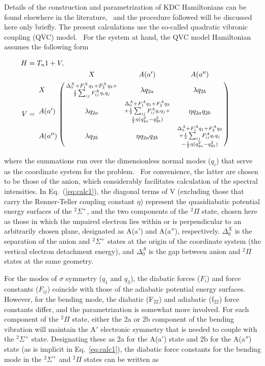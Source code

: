 \documentclass[journal=jpcafh,manuscript=article,layout=onecolumn, 12pt]{achemso}
\begin{document}
Details of the construction and parametrization of KDC Hamiltonians can be found elsewhere in the literature,~\cite{sta21,ich06,ich08,ich09,wei17} and the procedure followed will be discussed here only briefly. The present calculations use the so-called quadratic vibronic coupling (QVC) model.~\cite{ich06} For the system at hand, the QVC model Hamiltonian  assumes the following form

\begin{align}
H &= T_n1+V,\\
V &= \bordermatrix{ & X & A(a') & A(a'') \cr
	X &\substack{\Delta_0^X+F_1^Xq_1+F_3^Xq_3+\\ 
		\frac{1}{2} \sum_{ij}F^X_{ij}q_iq_j}& \lambda q_{2a} & \lambda q_{2b} \cr
	A(a') & \lambda q_{2a} & \substack{\Delta^A_0+F^A_1q_1+F^A_3q_3\\+\frac{1}{2}\sum_{ij}F^A_{ij}q_iq_j+\\\frac{1}{2}\eta(q_{2a}^2-q_{2b}^2)} & \eta q_{2a}q_{2b} \cr
	A(a'') & \lambda q_{2b} & \eta q_{2a}q_{2b} & \substack{\Delta_0^A+F_1^Aq_1+F_3^Aq_3\\+\frac{1}{2}\sum_{ij}F_{ij}^Aq_iq_j\\-\frac{1}{2}\eta(q_{2a}^2-q_{2b}^2) } } \qquad
\label{eq:calc1}
\end{align}

where the summations run over the dimensionless normal modes ($q_i$) that serve as the coordinate system for the problem.~\cite{sta21,car00} For convenience, the latter are chosen to be those of the anion, which considerably facilitates calculation of the spectral intensities.  In Eq.~(\ref{eq:calc1}), the diagonal terms of V (excluding those that carry the Renner-Teller coupling constant $\eta$) represent the quasidiabatic potential energy surfaces of the $^2\Sigma^+$, and the two components of the $^2\Pi$ state, chosen here as those in which the unpaired electron lies within or is perpendicular to an arbitrarily chosen plane, designated as A(a$'$) and A(a$''$), respectively. $\Delta_0^X$ is the separation of the anion and $^2\Sigma^+$ states at the origin of the coordinate system (the vertical electron detachment energy), and $\Delta_0^{A}$ is the gap between anion and $^2\Pi$ states at the same geometry.   

For the modes of $\sigma$ symmetry ($q_1$ and $q_3$), the diabatic forces ($F_i$) and force constants ($F_{ij}$) coincide with those of the adiabatic potential energy surfaces.   However, for the bending mode, the diabatic (F$_{22}$) and adiabatic (f$_{22}$) force constants differ, and the parametrization is somewhat more involved.   For each component of the $^2\Pi$ state, either the 2a or 2b component of the bending vibration will maintain the A$'$ electronic symmetry that is needed to couple with the $^2\Sigma^+$ state.  Designating these as 2a for the A(a$'$) state and 2b for the A(a$''$) state (as is implicit in Eq.~\ref{eq:calc1}), the diabatic force constants for the bending mode in the $^2\Sigma^+$ and $^2\Pi$ states can be written as 
\end{document}
